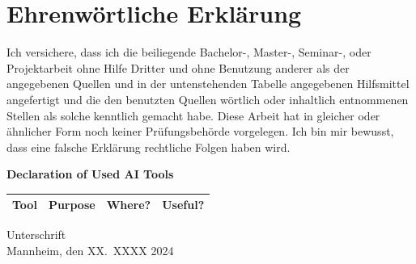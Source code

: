 \documentclass[a4paper,oneside,bibliography=totoc]{scrbook}
\begin{document}
\backmatter
\chapter{Ehrenwörtliche Erklärung}
\label{ch:declaration}

Ich versichere, dass ich die beiliegende Bachelor-, Master-, Seminar-, oder
Projektarbeit ohne Hilfe Dritter und ohne Benutzung anderer als der angegebenen
Quellen und in der untenstehenden Tabelle angegebenen Hilfsmittel angefertigt
und die den benutzten Quellen wörtlich oder inhaltlich entnommenen Stellen als
solche kenntlich gemacht habe. Diese Arbeit hat in gleicher oder ähnlicher Form
noch keiner Prüfungsbehörde vorgelegen. Ich bin mir bewusst, dass eine falsche
Erklärung rechtliche Folgen haben wird.

\begin{center}
  \textbf{Declaration of Used AI Tools} \\[.3em]
  \begin{tabularx}{\textwidth}{lXlc}
    \toprule
    Tool & Purpose & Where? & Useful? \\
    \midrule
    \bottomrule
  \end{tabularx}
\end{center}

\vspace{2cm}
\noindent Unterschrift\\
\noindent Mannheim, den XX.~XXXX 2024 \hfill
\end{document}
